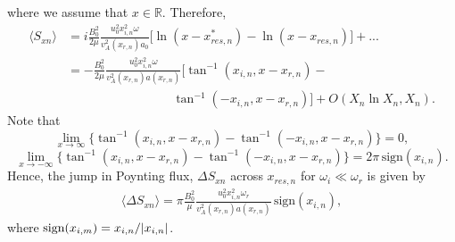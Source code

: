 where we assume that $x\in\mathds{R}$.
Therefore,
\begin{equation}
\begin{aligned}
    \label{eq:chap_4_avg_poy_flux_leading_order_alpha=0}
    \langle S_{xn} \rangle &= i\frac{B_0^2}{2\mu}\frac{u_0^2x_{i,n}^2\omega}{v_{A}^2(x_{r,n})a_{0}}\big[\ln(x-x_{res,n}^*)-\ln(x-x_{res,n})\big] + ...  \\
    &= -\frac{B_0^2}{2\mu}\frac{u_0^2x_{i,n}^2\omega}{v_{A}^2(x_{r,n})a(x_{r,n})}\big[\tan^{-1}(x_{i,n},x-x_{r,n})-\\
    &\qquad\qquad\qquad\qquad\ \ \tan^{-1}(-x_{i,n},x-x_{r,n})\big] + O(X_n\ln X_n, X_n).
\end{aligned}
\end{equation}
Note that
\[\lim_{x\rightarrow\infty}\big\{\tan^{-1}(x_{i,n},x-x_{r,n})-\tan^{-1}(-x_{i,n},x-x_{r,n})\big\}=0,\]
\[\lim_{x\rightarrow-\infty}\big\{\tan^{-1}(x_{i,n},x-x_{r,n})-\tan^{-1}(-x_{i,n},x-x_{r,n})\big\}=2\pi\,\text{sign}(x_{i,n}).\]
Hence, the jump in Poynting flux, $\Delta S_{xn}$ across $x_{res,n}$ for $\omega_i\ll\omega_r$ is given by
\begin{equation}
    \label{eq:chap_4_jump_in_poynting_flux}
    \begin{aligned}
    \langle \Delta S_{xn}\rangle = \pi\frac{B_0^2}{\mu}\frac{u_0^2x_{i,n}^2\omega_r}{v_{A}^2(x_{r,n})a(x_{r,n})}\,\text{sign}(x_{i,n}),
    \end{aligned}
\end{equation}
where $\text{sign}(x_{i,m}) = x_{i,n} / \abs{x_{i,n}}$.

